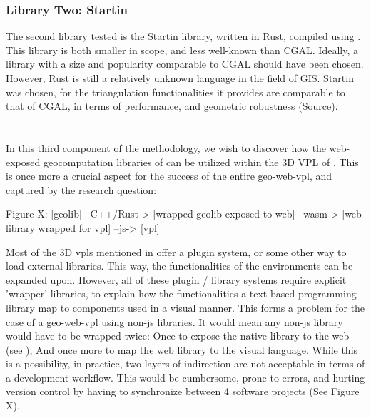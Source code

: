\subsubsection*{Library Two: Startin}
The second library tested is the Startin library, written in Rust, compiled using .  
This library is both smaller in scope, and less well-known than CGAL. 
Ideally, a library with a size and popularity comparable to CGAL should have been chosen.
However, Rust is still a relatively unknown language in the field of GIS. 
Startin was chosen, for the triangulation functionalities it provides are comparable to that of CGAL, in terms of performance, and geometric robustness (Source). 


\section{\mySubRQThreeTitle} 
\label{sec:method-three}

In this third component of the methodology, we wish to discover how the web-exposed geocomputation libraries of  can be utilized within the 3D VPL of . 
This is once more a crucial aspect for the success of the entire \ac*{geo-web-vpl}, 
and captured by the research question: \mySubRQThree



\begin{note}
Figure X: [geolib] --C++/Rust-> [wrapped geolib exposed to web] --wasm-> [web library wrapped for vpl] --js-> [vpl]
\end{note}

Most of the 3D vpls mentioned in  offer a plugin system, or some other way to load external libraries.
This way, the functionalities of the environments can be expanded upon.
However, all of these plugin / library systems require explicit 'wrapper' libraries, to explain how the functionalities a text-based programming library map to components used in a visual manner.
This forms a problem for the case of a \ac{geo-web-vpl} using non-js libraries. 
It would mean any non-js library would have to be wrapped twice: 
Once to expose the native library to the web (see ),
And once more to map the web library to the visual language. 
While this is a possibility, in practice, two layers of indirection are not acceptable in terms of a development workflow.
This would be cumbersome, prone to errors, and hurting version control by having to synchronize between 4 software projects (See Figure X). 

